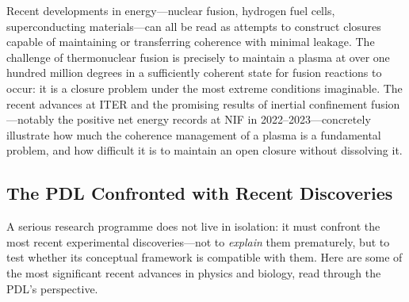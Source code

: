 \documentclass[12pt, a4paper, openright]{book}
\begin{document}
\medskip

Recent developments in energy---nuclear fusion, hydrogen fuel cells, superconducting materials---can all be read as attempts to construct closures capable of maintaining or transferring coherence with minimal leakage. The challenge of thermonuclear fusion is precisely to maintain a plasma at over one hundred million degrees in a sufficiently coherent state for fusion reactions to occur: it is a closure problem under the most extreme conditions imaginable. The recent advances at ITER and the promising results of inertial confinement fusion---notably the positive net energy records at NIF in 2022--2023---concretely illustrate how much the coherence management of a plasma is a fundamental problem, and how difficult it is to maintain an open closure without dissolving it.

\subsection*{The PDL Confronted with Recent Discoveries}

A serious research programme does not live in isolation: it must confront the most recent experimental discoveries---not to \emph{explain} them prematurely, but to test whether its conceptual framework is compatible with them. Here are some of the most significant recent advances in physics and biology, read through the PDL's perspective.
\end{document}
